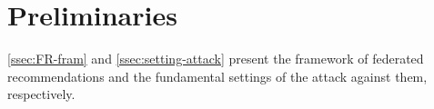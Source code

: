 \section{Preliminaries}
\label{ssec:preliminaries}

\cref{ssec:FR-fram} and \cref{ssec:setting-attack} present the framework of federated recommendations and the fundamental settings of the attack against them, respectively.



